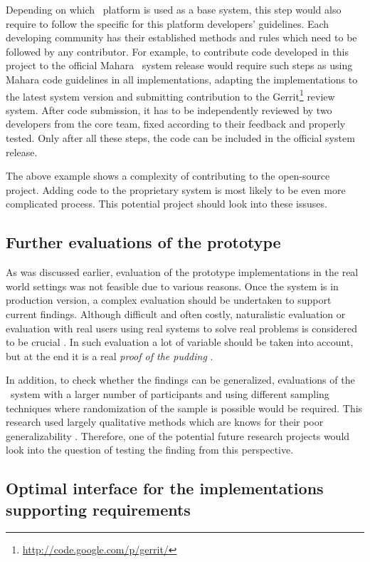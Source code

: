 Depending on which \ep~platform is used as a base system, this step would also
require to follow the specific for this platform developers' guidelines. Each
developing community has their established methods and rules which need to be
followed by any contributor. For example, to contribute code developed in this
project to the official Mahara \ep~system release would require such steps as
using Mahara code guidelines in all implementations, adapting the
implementations to the latest system version and submitting contribution to the
Gerrit\footnote{\url{http://code.google.com/p/gerrit/}} review system. After
code submission, it has to be independently reviewed by two developers from the
core team, fixed according to their feedback and properly tested. Only after all
these steps, the code can be included in the official system release.

The above example shows a complexity of contributing to the open-source project.
Adding code to the proprietary system is most likely to be even more complicated
process. This potential project should look into these issuses.

\subsection{Further evaluations of the prototype}
As was discussed earlier, evaluation of the prototype implementations in the
real world settings was not feasible due to various reasons. Once the system is
in production version, a complex evaluation should be undertaken to support
current findings. Although difficult and often costly, naturalistic evaluation
or evaluation with real users using real systems to solve real problems is
considered to be crucial \citep{Pries-Heje2008}. In such evaluation a lot of
variable should be taken into account, but at the end it is a real \textit{proof
of the pudding} \citep{Venable2010}.

In addition, to check whether the findings can be generalized, evaluations of
the \ep~system with a larger number of participants and using different sampling
techniques where randomization of the sample is possible would be required. This
research used largely qualitative methods which are knows for their poor
generalizability \citep{Trochim2001}. Therefore, one of the potential future
research projects would look into the question of testing the finding from this
perspective.

\subsection[Optimal interface design]{Optimal interface for the implementations
supporting \LLLs requirements} 

